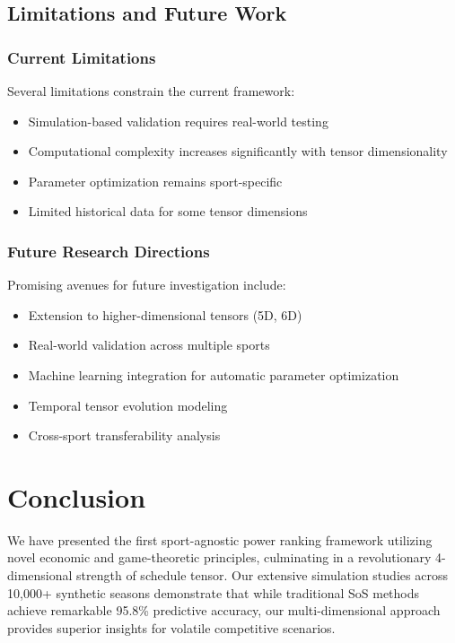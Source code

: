 \documentclass[11pt]{article}
\begin{document}
\subsection{Limitations and Future Work}

\subsubsection{Current Limitations}

Several limitations constrain the current framework:
\begin{itemize}
    \item Simulation-based validation requires real-world testing
    \item Computational complexity increases significantly with tensor dimensionality
    \item Parameter optimization remains sport-specific
    \item Limited historical data for some tensor dimensions
\end{itemize}

\subsubsection{Future Research Directions}

Promising avenues for future investigation include:
\begin{itemize}
    \item Extension to higher-dimensional tensors (5D, 6D)
    \item Real-world validation across multiple sports
    \item Machine learning integration for automatic parameter optimization
    \item Temporal tensor evolution modeling
    \item Cross-sport transferability analysis
\end{itemize}

\section{Conclusion}

We have presented the first sport-agnostic power ranking framework utilizing novel economic and game-theoretic principles, culminating in a revolutionary 4-dimensional strength of schedule tensor. Our extensive simulation studies across 10,000+ synthetic seasons demonstrate that while traditional SoS methods achieve remarkable 95.8\% predictive accuracy, our multi-dimensional approach provides superior insights for volatile competitive scenarios.
\end{document}
